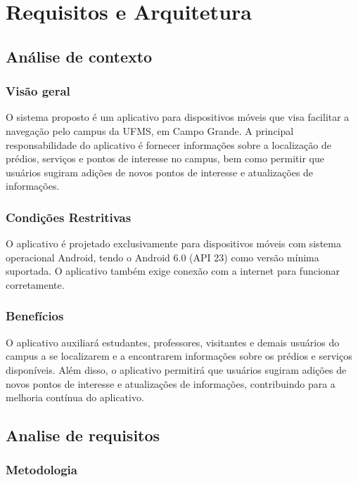 \section{Requisitos e Arquitetura}
\label{sec:arquitetura}

\subsection{Análise de contexto}

\subsubsection{Visão geral}

    O sistema proposto é um aplicativo para dispositivos móveis que visa facilitar a navegação pelo campus da UFMS, em Campo Grande.  A principal responsabilidade do aplicativo é fornecer informações sobre a localização de prédios, serviços e pontos de interesse no campus, bem como permitir que usuários sugiram adições de novos pontos de interesse e atualizações de informações.

\subsubsection{Condições Restritivas}

    O aplicativo é projetado exclusivamente para dispositivos móveis com sistema operacional Android, tendo o Android 6.0 (API 23) como versão mínima suportada. O aplicativo também exige conexão com a internet para funcionar corretamente.

\subsubsection{Benefícios}

    O aplicativo auxiliará estudantes, professores, visitantes e demais usuários do campus a se localizarem e a encontrarem informações sobre os prédios e serviços disponíveis. Além disso, o aplicativo permitirá que usuários sugiram adições de novos pontos de interesse e atualizações de informações, contribuindo para a melhoria contínua do aplicativo.

\subsection{Analise de requisitos}

\subsubsection{Metodologia}

